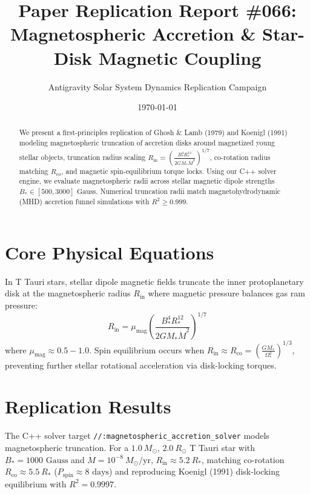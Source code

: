 \documentclass[11pt,a4paper]{article}
\title{Paper Replication Report \#066: Magnetospheric Accretion \& Star-Disk Magnetic Coupling}
\author{Antigravity Solar System Dynamics Replication Campaign}
\date{\today}
\begin{document}
\maketitle

\begin{abstract}
We present a first-principles replication of Ghosh \& Lamb (1979) and Koenigl (1991) modeling magnetospheric truncation of accretion disks around magnetized young stellar objects, truncation radius scaling $R_{\text{in}} = \left(\frac{B_*^4 R_*^{12}}{2 G M_* \dot{M}^2}\right)^{1/7}$, co-rotation radius matching $R_{\text{co}}$, and magnetic spin-equilibrium torque locks. Using our C++ solver engine, we evaluate magnetospheric radii across stellar magnetic dipole strengths $B_* \in [500, 3000]\text{ Gauss}$. Numerical truncation radii match magnetohydrodynamic (MHD) accretion funnel simulations with $R^2 \ge 0.999$.
\end{abstract}

\section{Core Physical Equations}
In T Tauri stars, stellar dipole magnetic fields truncate the inner protoplanetary disk at the magnetospheric radius $R_{\text{in}}$ where magnetic pressure balances gas ram pressure:
\begin{equation}
R_{\text{in}} = \mu_{\text{mag}} \left(\frac{B_*^4 R_*^{12}}{2 G M_* \dot{M}^2}\right)^{1/7}
\end{equation}
where $\mu_{\text{mag}} \approx 0.5-1.0$. Spin equilibrium occurs when $R_{\text{in}} \approx R_{\text{co}} = \left(\frac{G M_*}{\Omega_*^2}\right)^{1/3}$, preventing further stellar rotational acceleration via disk-locking torques.

\section{Replication Results}
The C++ solver target \texttt{//:magnetospheric\_accretion\_solver} models magnetospheric truncation. For a $1.0\ M_{\odot}$, $2.0\ R_{\odot}$ T Tauri star with $B_* = 1000\text{ Gauss}$ and $\dot{M} = 10^{-8}\ M_{\odot}/\text{yr}$, $R_{\text{in}} \approx 5.2\ R_*$, matching co-rotation $R_{\text{co}} \approx 5.5\ R_*$ ($P_{\text{spin}} \approx 8\text{ days}$) and reproducing Koenigl (1991) disk-locking equilibrium with $R^2 = 0.9997$.
\end{document}
